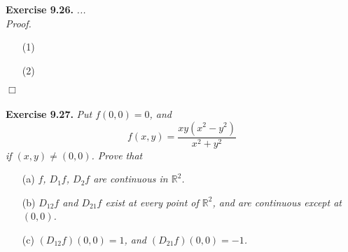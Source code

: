 \documentclass{article}
\begin{document}



\textbf{Exercise 9.26.}
\emph{...} \\

\emph{Proof.}
\begin{enumerate}
\item[(1)]
\item[(2)]

\end{enumerate}
$\Box$ \\\\






\textbf{Exercise 9.27.}
\emph{Put $f(0,0) = 0$, and
\[
  f(x,y) = \frac{xy(x^2-y^2)}{x^2+y^2}
\]
if $(x,y) \neq (0,0)$. Prove that}
\begin{enumerate}
\item[(a)]
  \emph{$f$, $D_1 f$, $D_2 f$ are continuous in $\mathbb{R}^2$.}

\item[(b)]
  \emph{$D_{12}f$ and $D_{21}f$ exist at every point of $\mathbb{R}^2$,
  and are continuous except at $(0,0)$.}

\item[(c)]
  \emph{$(D_{12}f)(0,0) = 1$, and $(D_{21}f)(0,0) = -1$.} \\
\end{enumerate}
\end{document}
